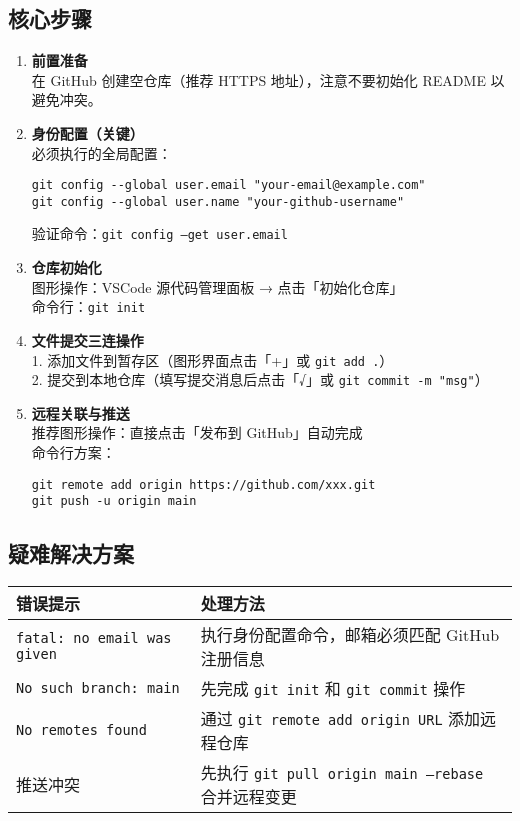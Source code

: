 \subsection{核心步骤}
\begin{enumerate}[leftmargin=*, nosep]
\item \textbf{前置准备} \\
在 GitHub 创建空仓库（推荐 HTTPS 地址），注意不要初始化 README 以避免冲突。

\item \textbf{身份配置（关键）} \\
必须执行的全局配置：
\begin{verbatim}
git config --global user.email "your-email@example.com"
git config --global user.name "your-github-username"
\end{verbatim}
验证命令：\texttt{git config --get user.email}

\item \textbf{仓库初始化} \\
图形操作：VSCode 源代码管理面板 → 点击「初始化仓库」\\
命令行：\texttt{git init}

\item \textbf{文件提交三连操作} \\
1. 添加文件到暂存区（图形界面点击「+」或 \texttt{git add .}）\\
2. 提交到本地仓库（填写提交消息后点击「√」或 \texttt{git commit -m "msg"}）

\item \textbf{远程关联与推送} \\
推荐图形操作：直接点击「发布到 GitHub」自动完成\\
命令行方案：
\begin{verbatim}
git remote add origin https://github.com/xxx.git
git push -u origin main
\end{verbatim}
\end{enumerate}

\subsection{疑难解决方案}
\begin{tabular}{lp{}}
\textbf{错误提示} & \textbf{处理方法} \\
\hline
\texttt{fatal: no email was given} & 执行身份配置命令，邮箱必须匹配 GitHub 注册信息 \\
\texttt{No such branch: main} & 先完成 \texttt{git init} 和 \texttt{git commit} 操作 \\
\texttt{No remotes found} & 通过 \texttt{git remote add origin URL} 添加远程仓库 \\
推送冲突 & 先执行 \texttt{git pull origin main --rebase} 合并远程变更 \\
\end{tabular}

